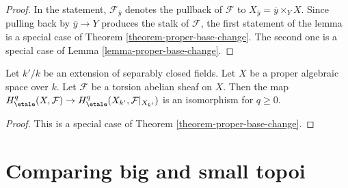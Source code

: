 \begin{proof}
In the statement, $\mathcal{F}_{\overline{y}}$ denotes the pullback
of $\mathcal{F}$ to $X_{\overline{y}} = \overline{y} \times_Y X$.
Since pulling back by $\overline{y} \to Y$ produces the
stalk of $\mathcal{F}$, the first statement of the lemma
is a special case of Theorem \ref{theorem-proper-base-change}.
The second one is a special case of Lemma \ref{lemma-proper-base-change}.
\end{proof}

\begin{lemma}
\label{lemma-base-change-separably-closed}
Let $k'/k$ be an extension of separably closed fields.
Let $X$ be a proper algebraic space over $k$.
Let $\mathcal{F}$ be a torsion abelian sheaf on $X$.
Then the map $H^q_\etale(X, \mathcal{F}) \to
H^q_\etale(X_{k'}, \mathcal{F}|_{X_{k'}})$ is an isomorphism
for $q \geq 0$.
\end{lemma}

\begin{proof}
This is a special case of Theorem \ref{theorem-proper-base-change}.
\end{proof}










\section{Comparing big and small topoi}
\label{section-compare}

